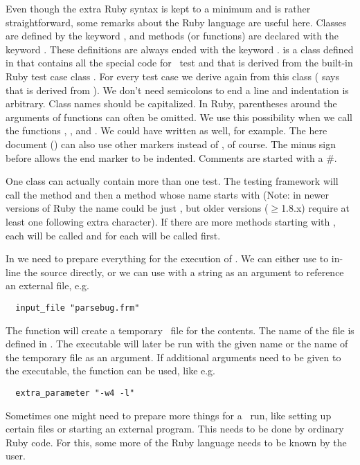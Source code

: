 Even though the extra Ruby syntax is kept to a minimum and is rather
straightforward, some remarks about the Ruby language are useful here. Classes
are defined by the keyword , and methods (or functions) are declared
with the keyword . These definitions are always ended with the keyword
.  is a class defined in  that contains all the
special code for \FORM\ test and that is derived from the built-in Ruby test
case class . For every test case we derive again from this class
( says that  is derived from ). We don't need
semicolons to end a line and indentation is arbitrary. Class names should be
capitalized. In Ruby, parentheses around the arguments of functions can often be
omitted. We use this possibility when we call the functions ,
, and . We could have written  as well,
for example. The here document () can also use other markers
instead of , of course. The minus sign before  allows the end
marker to be indented. Comments are started with a \#.

One class can actually contain more than one test. The testing framework will
call the method  and then a method whose name starts with 
(Note: in newer versions of Ruby the name could be just , but older
versions ($\ge$1.8.x) require at least one following extra character). If there are
more methods starting with , each will be called and for each 
will be called first.

In  we need to prepare everything for the execution of \FORM. We can
either use  to in-line the source directly, or we can use
 with a string as an argument to reference an external file,
e.g.
\begin{verbatim}
  input_file "parsebug.frm"
\end{verbatim}
The function  will create a temporary
\FORM\ file for the contents. The name of the file is defined in .
The executable will later be run with the given name or the name of the
temporary file as an argument. If additional arguments need to be given to the
executable, the function  can be used, like e.g.
\begin{verbatim}
  extra_parameter "-w4 -l"
\end{verbatim}

Sometimes one might need to prepare more things for a \FORM\ run, like setting
up certain files or starting an external program. This needs to be done
by ordinary Ruby code. For this, some more of the Ruby language needs to be
known by the user.

